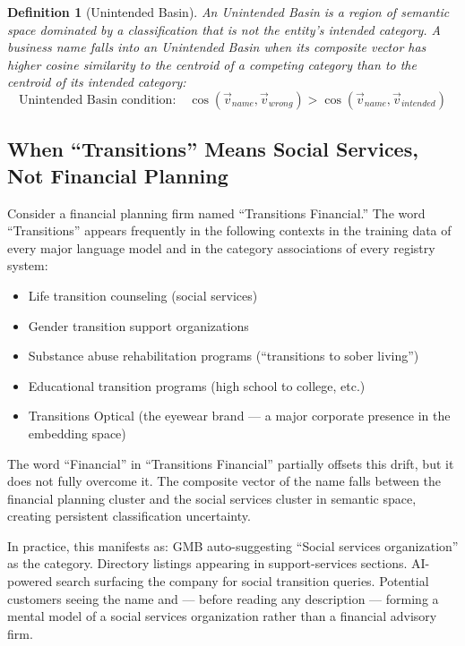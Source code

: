 \documentclass[12pt, openany]{book}
\theoremstyle{thmstyle}
\theoremstyle{defstyle}
\newtheorem{definition}{Definition}[chapter]
\begin{document}
\begin{definition}[Unintended Basin]
An Unintended Basin is a region of semantic space dominated by a classification that is not the entity's intended category. A business name falls into an Unintended Basin when its composite vector has higher cosine similarity to the centroid of a competing category than to the centroid of its intended category:
\[
\text{Unintended Basin condition:} \quad \cos(\vec{v}_{name}, \vec{v}_{wrong}) > \cos(\vec{v}_{name}, \vec{v}_{intended})
\]
\end{definition}

\subsection{When ``Transitions'' Means Social Services, Not Financial Planning}

Consider a financial planning firm named ``Transitions Financial.'' The word ``Transitions'' appears frequently in the following contexts in the training data of every major language model and in the category associations of every registry system:

\begin{itemize}[leftmargin=1.5em]
  \item Life transition counseling (social services)
  \item Gender transition support organizations
  \item Substance abuse rehabilitation programs (``transitions to sober living'')
  \item Educational transition programs (high school to college, etc.)
  \item Transitions Optical (the eyewear brand --- a major corporate presence in the embedding space)
\end{itemize}

The word ``Financial'' in ``Transitions Financial'' partially offsets this drift, but it does not fully overcome it. The composite vector of the name falls between the financial planning cluster and the social services cluster in semantic space, creating persistent classification uncertainty.

In practice, this manifests as: GMB auto-suggesting ``Social services organization'' as the category. Directory listings appearing in support-services sections. AI-powered search surfacing the company for social transition queries. Potential customers seeing the name and --- before reading any description --- forming a mental model of a social services organization rather than a financial advisory firm.
\end{document}
